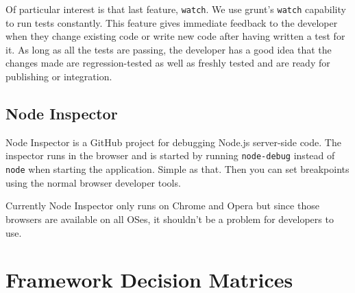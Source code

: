 \documentclass[12pt]{ucthesis}
\begin{document}
Of particular interest is that last feature, \lstinline{watch}. We use grunt's \lstinline{watch} capability to run tests constantly. This feature gives immediate feedback to the developer when they change existing code or write new code after having written a test for it. As long as all the tests are passing, the developer has a good idea that the changes made are regression-tested as well as freshly tested and are ready for publishing or integration.

\subsection{Node Inspector}
Node Inspector\cite{NodeInspector} is a GitHub project for debugging Node.js server-side code. The inspector runs in the browser and is started by running \lstinline{node-debug} instead of \lstinline{node} when starting the application. Simple as that. Then you can set breakpoints using the normal browser developer tools.

Currently Node Inspector only runs on Chrome and Opera but since those browsers are available on all OSes, it shouldn't be a problem for developers to use.

\section{Framework Decision Matrices}
\FloatBarrier
\begin{table}[ht]
\end{table}
\FloatBarrier
\footnotesize
\end{document}
